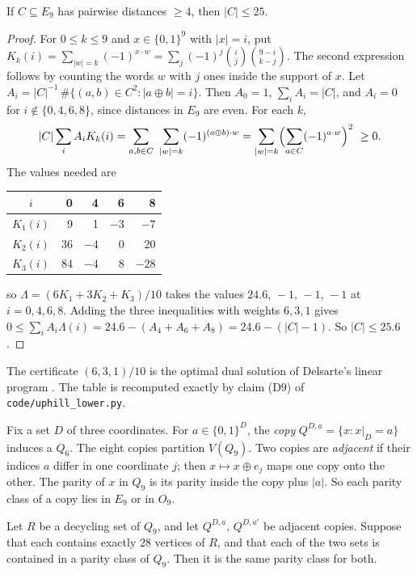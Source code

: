 \begin{lemma}\label{p2c5:lem:del}
If $C\subseteq E_9$ has pairwise distances $\ge4$, then $|C|\le25$.
\end{lemma}

\begin{proof}
For $0\le k\le9$ and $x\in\{0,1\}^9$ with $|x|=i$, put
$K_k(i)=\sum_{|w|=k}(-1)^{x\cdot w}=\sum_j(-1)^j\binom ij\binom{9-i}{k-j}$. The second expression
follows by counting the words $w$ with $j$ ones inside the support of $x$. Let
$A_i=|C|^{-1}\,\#\{(a,b)\in C^2:|a\oplus b|=i\}$. Then $A_0=1$, $\sum_iA_i=|C|$, and $A_i=0$ for
$i\notin\{0,4,6,8\}$, since distances in $E_9$ are even. For each $k$,
\[
  |C|\sum_iA_iK_k(i)=\sum_{a,b\in C}\ \sum_{|w|=k}(-1)^{(a\oplus b)\cdot w}
  =\sum_{|w|=k}\Bigl(\sum_{a\in C}(-1)^{a\cdot w}\Bigr)^2\ \ge0 .
\]
The values needed are
\begin{center}
\begin{tabular}{c|rrrr}
$i$ & 0 & 4 & 6 & 8\\\hline
$K_1(i)$ & 9 & 1 & $-3$ & $-7$\\
$K_2(i)$ & 36 & $-4$ & 0 & 20\\
$K_3(i)$ & 84 & $-4$ & 8 & $-28$
\end{tabular}
\end{center}
so $\Lambda=(6K_1+3K_2+K_3)/10$ takes the values $24.6,\,-1,\,-1,\,-1$ at $i=0,4,6,8$. Adding the
three inequalities with weights $6,3,1$ gives
$0\le\sum_iA_i\Lambda(i)=24.6-(A_4+A_6+A_8)=24.6-(|C|-1)$. So $|C|\le25.6$.
\end{proof}

The certificate $(6,3,1)/10$ is the optimal dual solution of Delsarte's linear program
\cite{MS77}. The table is recomputed exactly by claim (D9) of \texttt{code/uphill\_lower.py}.

Fix a set $D$ of three coordinates. For $a\in\{0,1\}^D$, the \emph{copy}
$Q^{D,a}=\{x:x|_D=a\}$ induces a $Q_6$. The eight copies partition $V(Q_9)$. Two copies are
\emph{adjacent} if their indices $a$ differ in one coordinate $j$; then $x\mapsto x\oplus e_j$ maps
one copy onto the other. The parity of $x$ in $Q_9$ is its parity inside the copy plus $|a|$. So
each parity class of a copy lies in $E_9$ or in $O_9$.

\begin{lemma}\label{p2c5:lem:adj}
Let $R$ be a decycling set of $Q_9$, and let $Q^{D,a}$, $Q^{D,a'}$ be adjacent copies. Suppose that
each contains exactly $28$ vertices of $R$, and that each of the two sets is contained in a parity
class of $Q_9$. Then it is the same parity class for both.
\end{lemma}


